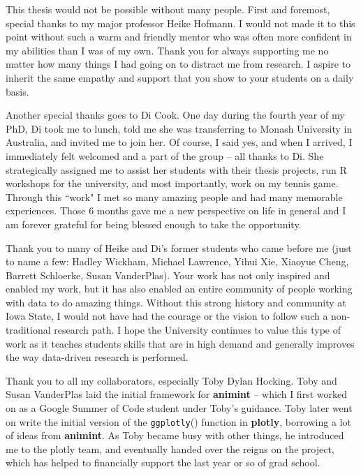 
This thesis would not be possible without many people. First and foremost, special thanks to my major professor Heike Hofmann. I would not made it to this point without such a warm and friendly mentor who was often more confident in my abilities than I was of my own. Thank you for always supporting me no matter how many things I had going on to distract me from research. I aspire to inherit the same empathy and support that you show to your students on a daily basis. 

Another special thanks goes to Di Cook. One day during the fourth year of my PhD, Di took me to lunch, told me she was transferring to Monash University in Australia, and invited me to join her. Of course, I said yes, and when I arrived, I immediately felt welcomed and a part of the group -- all thanks to Di. She strategically assigned me to assist her students with their thesis projects, run R workshops for the university, and most importantly, work on my tennis game. Through this ``work" I met so many amazing people and had many memorable experiences. Those 6 months gave me a new perspective on life in general and I am forever grateful for being blessed enough to take the opportunity.

Thank you to many of Heike and Di's former students who came before me (just to name a few: Hadley Wickham, Michael Lawrence, Yihui Xie, Xiaoyue Cheng, Barrett Schloerke, Susan VanderPlas). Your work has not only inspired and enabled my work, but it has also enabled an entire community of people working with data to do amazing things. Without this strong history and community at Iowa State, I would not have had the courage or the vision to follow such a non-traditional research path. I hope the University continues to value this type of work as it teaches students skills that are in high demand and generally improves the way data-driven research is performed.

Thank you to all my collaborators, especially Toby Dylan Hocking. Toby and Susan VanderPlas laid the initial framework for \textbf{animint} -- which I first worked on as a Google Summer of Code student under Toby's guidance. Toby later went on write the initial version of the \texttt{ggplotly}() function in \textbf{plotly}, borrowing a lot of ideas from \textbf{animint}. As Toby became busy with other things, he introduced me to the plotly team, and eventually handed over the reigns on the project, which has helped to financially support the last year or so of grad school.


